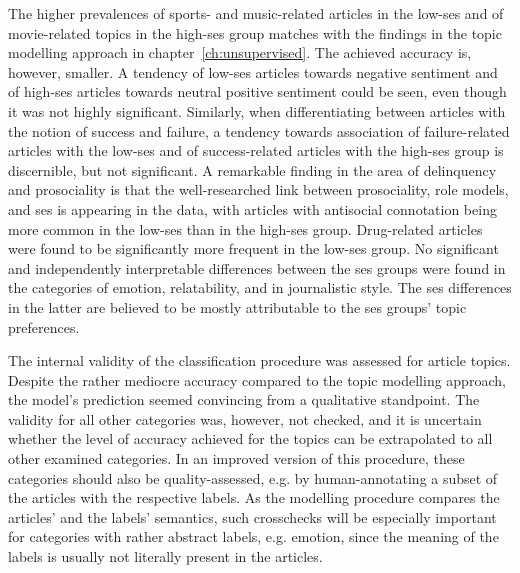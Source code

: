 The higher prevalences of sports- and music-related articles in the low-\gls{ses} and of movie-related topics in the high-\gls{ses} group matches with the findings in the topic modelling approach in chapter~\ref{ch:unsupervised}. The achieved accuracy is, however, smaller. A tendency of low-\gls{ses} articles towards negative sentiment and of high-\gls{ses} articles towards neutral positive sentiment could be seen, even though it was not highly significant. Similarly, when differentiating between articles with the notion of success and failure, a tendency towards association of failure-related articles with the low-\gls{ses} and of success-related articles with the high-\gls{ses} group is discernible, but not significant. A remarkable finding in the area of delinquency and prosociality is that the well-researched link between prosociality, role models, and \gls{ses} is appearing in the data, with articles with antisocial connotation being more common in the low-\gls{ses}  than in the high-\gls{ses} group. Drug-related articles were found to be significantly more frequent in the low-\gls{ses} group. No significant and independently interpretable differences between the \gls{ses} groups were found in the categories of emotion, relatability, and in journalistic style. The \gls{ses} differences in the latter are believed to be mostly attributable to the \gls{ses} groups' topic preferences.

The internal validity of the classification procedure was assessed for article topics. Despite the rather mediocre accuracy compared to the topic modelling approach, the model's prediction seemed convincing from a qualitative standpoint. The validity for all other categories was, however, not checked, and it is uncertain whether the level of accuracy achieved for the topics can be extrapolated to all other examined categories. In an improved version of this procedure, these categories should also be quality-assessed, e.g. by human-annotating a subset of the articles with the respective labels. As the modelling procedure compares the articles' and the labels' semantics, such crosschecks will be especially important for categories with rather abstract labels, e.g. emotion, since the meaning of the labels is usually not literally present in the articles.


